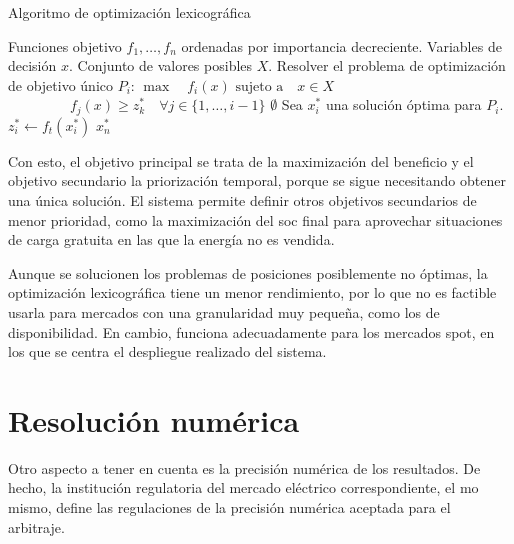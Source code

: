 \begin{algorithm}
  \caption{Algoritmo de optimización lexicográfica}%
  \label{alg:optimizacion-lexicografica}
  \begin{algorithmic}
    \Require{} Funciones objetivo \( f_{1}, \dots, f_{n} \) ordenadas por importancia decreciente.
    \Require{} Variables de decisión \( x \).
    \Require{} Conjunto de valores posibles \( X \).
    \State{} Resolver el problema de optimización de objetivo único \( P_{i} \):
    \Statex{} \hspace{\algorithmicindent} \( \max \quad f_{i}(x) \)
    \Statex{} \hspace{\algorithmicindent} \( \text{sujeto a} \quad x \in X \)
    \Statex{} \hspace{\algorithmicindent} \( \phantom{\text{sujeto a} \quad} f_{j}(x) \geq z_k^* \quad \forall j \in \{1, \dots, i - 1\} \)
    \State{} \Return{} \( \emptyset \)
    \EndIf{}
    \State{} Sea \( x^{*}_{i} \) una solución óptima para \( P_{i} \).
    \State{} \( z^{*}_{i} \gets f_t(x^{*}_{i}) \) 
    \EndFor{}
    \State{} \Return{} \( x^{*}_{n} \)
  \end{algorithmic}
\end{algorithm}

Con esto, el objetivo principal se trata de la maximización del beneficio y el objetivo secundario la priorización temporal, porque se sigue necesitando obtener una única solución. El sistema permite definir otros objetivos secundarios de menor prioridad, como la maximización del \gls{soc} final para aprovechar situaciones de carga gratuita en las que la energía no es vendida.

Aunque se solucionen los problemas de posiciones posiblemente no óptimas, la optimización lexicográfica tiene un menor rendimiento, por lo que no es factible usarla para mercados con una granularidad muy pequeña, como los de disponibilidad. En cambio, funciona adecuadamente para los mercados spot, en los que se centra el despliegue realizado del sistema.

\section{Resolución numérica}%
\label{makereference5.4}

Otro aspecto a tener en cuenta es la precisión numérica de los resultados. De hecho, la institución regulatoria del mercado eléctrico correspondiente, el \gls{mo} mismo, define las regulaciones de la precisión numérica aceptada para el arbitraje.

